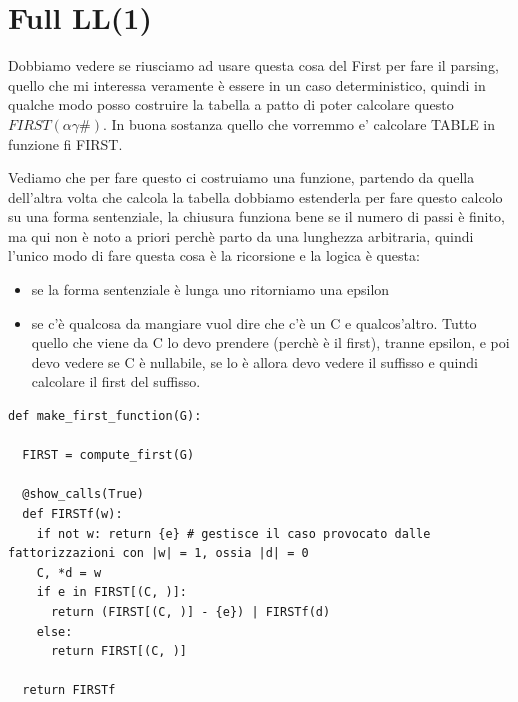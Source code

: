 \section{Full LL(1)}

Dobbiamo vedere se riusciamo ad usare questa cosa del First per fare il parsing, quello che mi interessa veramente è essere in un caso deterministico, quindi in qualche modo posso costruire la tabella a patto di poter calcolare questo $FIRST(\alpha \gamma \#)$. In buona sostanza quello che vorremmo e' calcolare TABLE in funzione fi FIRST.

Vediamo che per fare questo ci costruiamo una funzione, partendo da quella dell'altra volta che calcola la tabella dobbiamo estenderla per fare questo calcolo su una forma sentenziale, la chiusura funziona bene se il numero di passi è finito, ma qui non è noto a priori perchè parto da una lunghezza arbitraria, quindi l'unico modo di fare questa cosa è la ricorsione e la logica è questa:
\begin{itemize}
  \item se la forma sentenziale è lunga uno ritorniamo una epsilon
  \item se c'è qualcosa da mangiare vuol dire che c'è un C e qualcos'altro. Tutto quello che viene da C lo devo prendere (perchè è il first), tranne epsilon, e poi devo vedere se C è nullabile, se lo è allora devo vedere il suffisso e quindi calcolare il first del suffisso.
\end{itemize}

\begin{lstlisting}
def make_first_function(G):

  FIRST = compute_first(G)

  @show_calls(True)
  def FIRSTf(w):
    if not w: return {e} # gestisce il caso provocato dalle fattorizzazioni con |w| = 1, ossia |d| = 0
    C, *d = w
    if e in FIRST[(C, )]:
      return (FIRST[(C, )] - {e}) | FIRSTf(d)  
    else:
      return FIRST[(C, )]

  return FIRSTf
\end{lstlisting}

